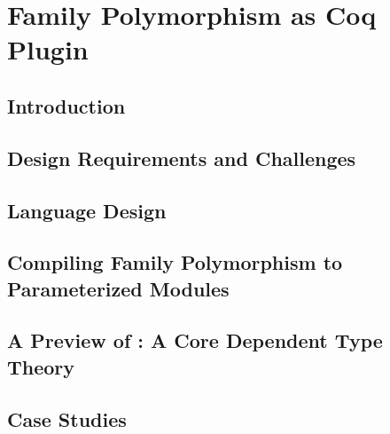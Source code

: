 

\newpage
{}
\setcounter{page}{1}
\chapter{Family Polymorphism as Coq Plugin}

\ifreport
\thispagestyle{tr-style}
\fi

\section{Introduction}
\label{sec:intro}



\section{Design Requirements and Challenges}
\label{sec:background+challenge}


\section{Language Design}
\label{sec:lang-design}


\section{Compiling Family Polymorphism to Parameterized Modules}
\label{sec:coqimpl}


\section{A Preview of \TT: A Core Dependent Type Theory}
\label{sec:metatheory2}



\section{Case Studies}
\label{sec:casestudies}



